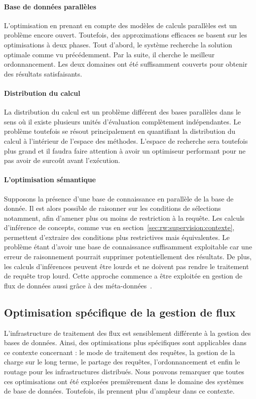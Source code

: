 \paragraph*{Base de données parallèles}
L'optimisation en prenant en compte des modèles de calculs parallèles est un problème encore ouvert. Toutefois, des approximations efficaces se basent sur les optimisations à deux phases. Tout d'abord, le système recherche la solution optimale comme vu précédemment. Par la suite, il cherche le meilleur ordonnancement. Les deux domaines ont été suffisamment couverts pour obtenir des résultats satisfaisants.

\paragraph*{Distribution du calcul}
La distribution du calcul est un problème différent des bases parallèles dans le sens où il existe plusieurs unités d'évaluation complètement indépendantes. Le problème toutefois se résout principalement en quantifiant la distribution du calcul à l'intérieur de l'espace des méthodes. L'espace de recherche sera toutefois plus grand et il faudra faire attention à avoir un optimiseur performant pour ne pas avoir de surcoût avant l'exécution.

\paragraph*{L'optimisation sémantique}
Supposons la présence d'une base de connaissance en parallèle de la base de donnée. Il est alors possible de raisonner sur les conditions de sélections notamment, afin d'amener plus ou moins de restriction à la requête. Les calculs d'inférence de concepts, comme vus en section~\ref{sec:rw:supervision:contexte}, permettent d'extraire des conditions plus restrictives mais équivalentes. Le problème étant d'avoir une base de connaissance suffisamment exploitable car une erreur de raisonnement pourrait supprimer potentiellement des résultats. De plus, les calculs d'inférences peuvent être lourds et ne doivent pas rendre le traitement de requête trop lourd. Cette approche commence a être exploitée en gestion de flux de données aussi grâce à des méta-données~\cite{Ding:semantic}.

\subsection{Optimisation spécifique de la gestion de flux}
L'infrastructure de traitement des flux est sensiblement différente à la gestion des bases de données. Ainsi, des optimisations plus spécifiques sont applicables dans ce contexte concernant : le mode de traitement des requêtes, la gestion de la charge sur le long terme, le partage des requêtes, l'ordonnancement et enfin le routage pour les infrastructures distribués. Nous pouvons remarquer que toutes ces optimisations ont été explorées premièrement dans le domaine des systèmes de base de données. Toutefois, ils prennent plus d'ampleur dans ce contexte.

